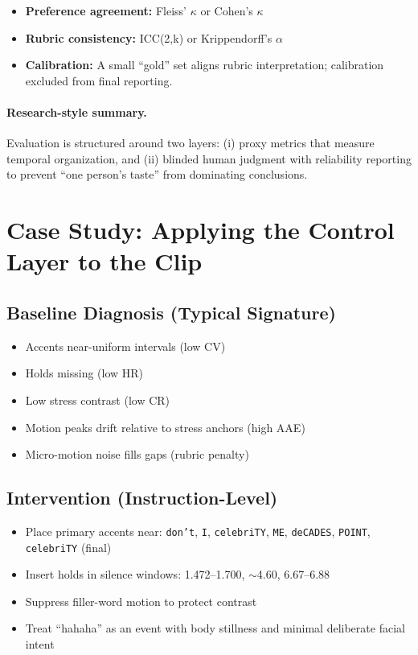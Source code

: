 \documentclass[11pt,a4paper]{article}
\begin{document}
\begin{itemize}[leftmargin=2em]
    \item \textbf{Preference agreement:} Fleiss' $\kappa$ or Cohen's $\kappa$
    \item \textbf{Rubric consistency:} ICC(2,k) or Krippendorff's $\alpha$
    \item \textbf{Calibration:} A small ``gold'' set aligns rubric interpretation; calibration excluded from final reporting.
\end{itemize}

\paragraph{Research-style summary.} Evaluation is structured around two layers: (i) proxy metrics that measure temporal organization, and (ii) blinded human judgment with reliability reporting to prevent ``one person's taste'' from dominating conclusions.

\section{Case Study: Applying the Control Layer to the Clip}

\subsection{Baseline Diagnosis (Typical Signature)}

\begin{itemize}[leftmargin=2em]
    \item Accents near-uniform intervals (low CV)
    \item Holds missing (low HR)
    \item Low stress contrast (low CR)
    \item Motion peaks drift relative to stress anchors (high AAE)
    \item Micro-motion noise fills gaps (rubric penalty)
\end{itemize}

\subsection{Intervention (Instruction-Level)}

\begin{itemize}[leftmargin=2em]
    \item Place primary accents near: \texttt{don't}, \texttt{I}, \texttt{celebriTY}, \texttt{ME}, \texttt{deCADES}, \texttt{POINT}, \texttt{celebriTY} (final)
    \item Insert holds in silence windows: 1.472--1.700, $\sim$4.60, 6.67--6.88
    \item Suppress filler-word motion to protect contrast
    \item Treat ``hahaha'' as an event with body stillness and minimal deliberate facial intent
\end{itemize}
\end{document}
